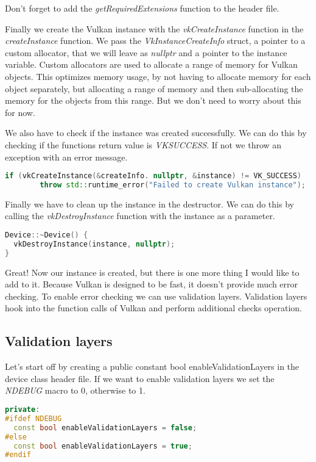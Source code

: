 \documentclass[12pt]{report} \usepackage{preamble}
\begin{document}
Don't forget to add the \textit{getRequiredExtensions} function to the header file.

Finally we create the Vulkan instance with the \textit{vkCreateInstance} function in the
\textit{createInstance} function. We pass the \textit{VkInstanceCreateInfo} struct, a pointer to
a custom allocator, that we will leave as \textit{nullptr} and a pointer to the instance variable.
Custom allocators are used to allocate a range of memory for Vulkan objects. This optimizes memory usage, by
not having to allocate memory for each object separately, but allocating a range of memory and then
sub-allocating the memory for the objects from this range. But we don't need to worry about this for now.

We also have to check if the instance was created successfully. We can do this by checking if the
functions return value is \textit{VK\textunderscore SUCCESS}. If not we throw an exception with an error message.

\begin{lstlisting}[language=C++]
if (vkCreateInstance(&createInfo. nullptr, &instance) != VK_SUCCESS) 
		throw std::runtime_error("Failed to create Vulkan instance");
\end{lstlisting}

Finally we have to clean up the instance in the destructor. We can do this by calling the
\textit{vkDestroyInstance} function with the instance as a parameter.

\begin{lstlisting}[language=C++]
Device::~Device() {
  vkDestroyInstance(instance, nullptr);
}
\end{lstlisting}

Great! Now our instance is created, but there is one more thing I would like to
add to it. Because Vulkan is designed to be fast, it doesn't
provide much error checking. To enable error checking we can use validation layers.
Validation layers hook into the function calls of Vulkan and perform additional checks
operation.

\subsection{Validation layers}

Let's start off by creating a public constant bool enableValidationLayers in the device class header file.
If we want to enable validation layers we set the \textit{NDEBUG} macro to 0, otherwise to 1.

\begin{lstlisting}[language=C++]
private:
#ifdef NDEBUG 
  const bool enableValidationLayers = false;
#else
  const bool enableValidationLayers = true;
#endif
\end{lstlisting}
\end{document}

